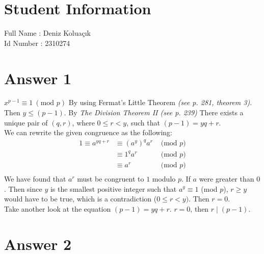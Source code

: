 \documentclass[12pt]{article}
\begin{document}
\section*{Student Information } 
Full Name : Deniz Koluaçık \\
Id Number : 2310274 \\

\section*{Answer 1}
$x^{p-1} \equiv 1\ (\text{mod } p) $ By using Fermat's Little Theorem \textit{(see p. 281, theorem 3)}. Then $y \leq (p-1)$. 
By \textit{The Division Theorem II (see p. 239)} There exists a unique pair of $(q,r)$, where $0 \leq r < y$, such that $(p-1) = yq + r$.\\

We can rewrite the given congruence as the following:
	\begin{align*}
		1\equiv a^{yq+r} &\equiv (a^y)^qa^r & \text{ (mod $p$)}\\
		&\equiv 1^qa^r & \text{ (mod $p$)}\\
		&\equiv a^r & \text{ (mod $p$)}\\
	\end{align*}
We have found that $a^r$ must be congruent to $1$ modulo $p$. If $a$ were greater than $0$. Then since $y$ is the smallest positive integer such that $a^y \equiv 1$ (mod $p$), $r \geq y$ would have to be true, which is a contradiction ($ 0 \leq r < y)$. Then $r=0$.\\

Take another look at the equation $(p-1) = yq + r$. $r=0$, then $r \mid (p-1)$.\\

\section*{Answer 2}
\begin{comment}
	
\textit{Foreword: The student is fully aware of the fact that the following approach is not the most elegant one ever, and although it is not explicitly forbidden, the ``brute-force'' method is not appreciated. However they used this method as a last resort after 3 days of hard work and research just for this single question bore no fruit at all.}\\
\end{comment}
\end{document}
